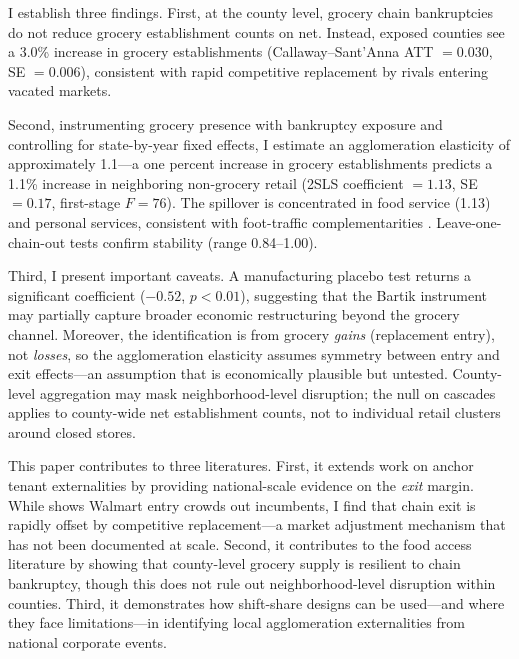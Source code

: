 \documentclass[12pt]{article}
\begin{document}
I establish three findings. First, at the county level, grocery chain bankruptcies do not reduce grocery establishment counts on net. Instead, exposed counties see a 3.0\% increase in grocery establishments (Callaway--Sant'Anna ATT $= 0.030$, SE $= 0.006$), consistent with rapid competitive replacement by rivals entering vacated markets.

Second, instrumenting grocery presence with bankruptcy exposure and controlling for state-by-year fixed effects, I estimate an agglomeration elasticity of approximately 1.1---a one percent increase in grocery establishments predicts a 1.1\% increase in neighboring non-grocery retail (2SLS coefficient $= 1.13$, SE $= 0.17$, first-stage $F = 76$). The spillover is concentrated in food service (1.13) and personal services, consistent with foot-traffic complementarities \citep{qian2023grocery}. Leave-one-chain-out tests confirm stability (range 0.84--1.00).

Third, I present important caveats. A manufacturing placebo test returns a significant coefficient ($-0.52$, $p < 0.01$), suggesting that the Bartik instrument may partially capture broader economic restructuring beyond the grocery channel. Moreover, the identification is from grocery \emph{gains} (replacement entry), not \emph{losses}, so the agglomeration elasticity assumes symmetry between entry and exit effects---an assumption that is economically plausible but untested. County-level aggregation may mask neighborhood-level disruption; the null on cascades applies to county-wide net establishment counts, not to individual retail clusters around closed stores.

This paper contributes to three literatures. First, it extends work on anchor tenant externalities \citep{jia2008walmart, basker2005job, qian2023grocery} by providing national-scale evidence on the \emph{exit} margin. While \citet{jia2008walmart} shows Walmart entry crowds out incumbents, I find that chain exit is rapidly offset by competitive replacement---a market adjustment mechanism that has not been documented at scale. Second, it contributes to the food access literature \citep{allcott2019food, davis2019dollar} by showing that county-level grocery supply is resilient to chain bankruptcy, though this does not rule out neighborhood-level disruption within counties. Third, it demonstrates how shift-share designs \citep{goldsmith2020bartik, borusyak2022quasi} can be used---and where they face limitations---in identifying local agglomeration externalities from national corporate events.
\end{document}
